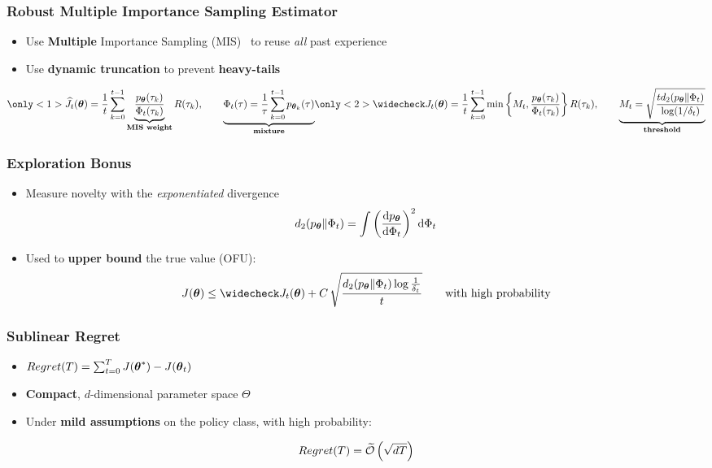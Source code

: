 \documentclass[aspectratio=169, table]{beamer}
\newcommand{\enb}[1]{\textcolor{poliblue1}{\textbf{#1}}}
\newcommand{\eno}[1]{\textcolor{orangep}{\textbf{#1}}}
\begin{document}
\begin{frame}
\frametitle{Robust Multiple Importance Sampling Estimator}
\begin{itemize}
	\setlength{\itemsep}{20pt}
	\item<1-> Use \eno{Multiple} Importance Sampling (MIS)~\cite{veach_optimally_1995} to reuse \emph{all} past experience
	\item<2-> Use \enb{dynamic truncation} to prevent \eno{heavy-tails}~\cite{bubeck2013bandits,metelli2018policy}
\end{itemize}
\begin{overlayarea}{\textwidth}{\textheight}
	\[
	\only<1>{
		\widehat{J}_t(\vtheta) = \frac{1}{t}\sum_{k=0}^{t-1}\underbrace{\frac{p_{\vtheta}(\tau_k)}{\Phi_t(\tau_k)}}_{\textbf{MIS weight}}R(\tau_k), \qquad \underbrace{\Phi_t(\tau) = \frac{1}{\tau}\sum_{k=0}^{t-1}p_{\vtheta_k}(\tau)}_{\textbf{mixture}}
	}
	\only<2>{
	\wc{J}_t(\vtheta) = \frac{1}{t}\sum_{k=0}^{t-1}\min\left\{M_t, \frac{p_{\vtheta}(\tau_k)}{\Phi_t(\tau_k)}\right\}R(\tau_k), \qquad \underbrace{M_t = \sqrt{\frac{td_{2}(p_{\vtheta}\|\Phi_t)}{\log(1/\delta_t)}}}_{\textbf{threshold}}
	}
	\]
\end{overlayarea}
\end{frame}

\begin{frame}
\frametitle{Exploration Bonus}
\begin{itemize}
	\item<1-> Measure novelty with the \emph{exponentiated} \Renyi divergence~\cite{cortes2010learning}
	\[
		d_2(p_{\boldsymbol{\theta}}\| \Phi_t) = \int \left(\frac{\mathrm{d} p_{\boldsymbol{\theta}}}{\mathrm{d} \Phi_t}\right)^2 \mathrm{d} \Phi_t
	\]
	\item Used to \enb{upper bound} the true value (OFU):
	\[
		J(\vtheta) \leq \wc{J}_t(\vtheta) + C\,
		\sqrt{\frac{d_{2}(p_{\vtheta}\|\Phi_{t})\log\frac{1}{\delta_t}}{t}} \qquad \text{with high probability}
	\] 
\end{itemize}
\end{frame}

\begin{frame} 
\frametitle{Sublinear Regret}
\begin{overlayarea}{\textwidth}{.4\textheight}
\begin{itemize}
	\setlength{\itemsep}{20pt}
	\item<1-> $\mathop{Regret}(T) = \sum_{t=0}^T J(\boldsymbol{\theta}^*) - J(\boldsymbol{\theta}_t)$
	\vfill
	\item<2-> \enb{Compact}, $d$-dimensional parameter space $\Theta$
	\vfill
	\item<3-> Under \enb{mild assumptions} on the policy class, with high probability:
\end{itemize}
\end{overlayarea}
\LARGE
\begin{align*}
\mathop{Regret}(T) = \widetilde{\mathcal{O}}\left(\sqrt{dT}\right)
\end{align*}
\end{frame}
\end{document}

